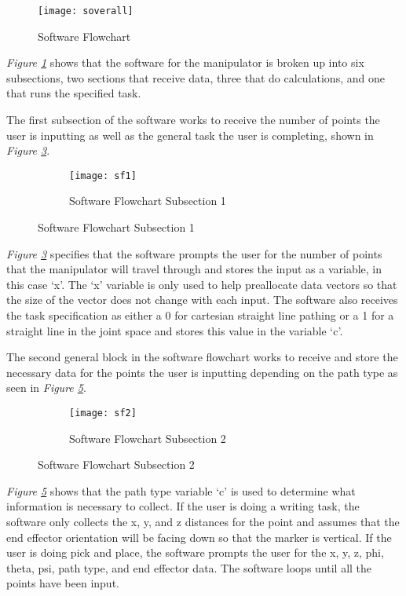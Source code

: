 \begin{figure}[htp]
  \center
  \texttt{[image: soverall]}
  \caption{Software Flowchart}
  \label{fig:soverall}
\end{figure}

\emph{Figure \ref{fig:soverall}} shows that the software for the manipulator is broken up into six subsections, two sections that receive data, three that do calculations, and one that runs the specified task.

The first subsection of the software works to receive the number of points the user is inputting as well as the general task the user is completing, shown in \emph{Figure \ref{fig:sf1}}. \\

\begin{figure}[htp] \ContinuedFloat
  \begin{subfigure}[c]{\textwidth}
  \center
  \texttt{[image: sf1]}
  \caption{Software Flowchart Subsection 1}
  \label{fig:sf1}
  \end{subfigure}
\end{figure}

\emph{Figure \ref{fig:sf1}} specifies that the software prompts the user for the number of points that the manipulator will travel through and stores the input as a variable, in this case ‘x’. The ‘x’ variable is only used to help preallocate data vectors so that the size of the vector does not change with each input. The software also receives the task specification as either a 0 for cartesian straight line pathing or a 1 for a straight line in the joint space and stores this value in the variable ‘c’.

The second general block in the software flowchart works to receive and store the necessary data for the points the user is inputting depending on the path type as seen in \emph{Figure \ref{fig:sf2}}.
\newpage
\begin{figure}[htp] \ContinuedFloat
  \begin{subfigure}[c]{\textwidth}
  \center
  \texttt{[image: sf2]}
  \caption{Software Flowchart Subsection 2}
  \label{fig:sf2}
\end{subfigure}
\end{figure}

\emph{Figure \ref{fig:sf2}} shows that the path type variable ‘c’ is used to determine what information is necessary to collect. If the user is doing a writing task, the software only collects the x, y, and z distances for the point and assumes that the end effector orientation will be facing down so that the marker is vertical. If the user is doing pick and place, the software prompts the user for the x, y, z, phi, theta, psi, path type, and end effector data. The software loops until all the points have been input.

